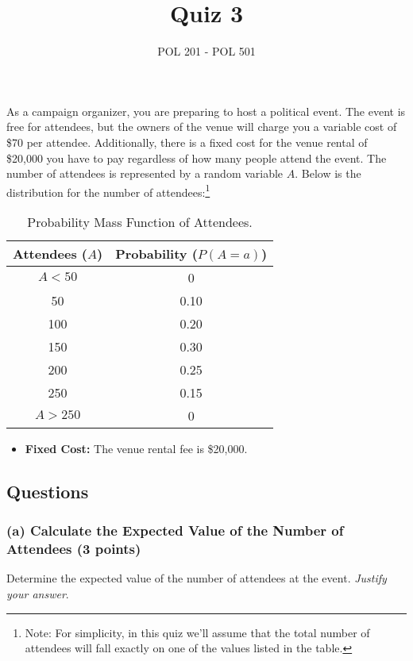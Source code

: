 \documentclass{article}
\title{Quiz 3}
\author{POL 201 - POL 501}
\date{}
\begin{document}
\maketitle


As a campaign organizer, you are preparing to host a political event. The event is free for attendees, but the owners of the venue will charge you a variable cost of \$70 per attendee. Additionally, there is a fixed cost for the venue rental of \$20,000 you have to pay regardless of how many people attend the event. The number of attendees is represented by a random variable $A$. Below is the distribution for the number of attendees:\footnote{Note: For simplicity, in this quiz we'll assume that the total number of attendees will fall exactly on one of the values listed in the table. }

\begin{table}[h!]
\centering
\begin{tabular}{c|c}
    \hline
    Attendees ($A$) & Probability ($P(A = a)$) \\
    \hline
    $A < 50$ & 0 \\
    50 & 0.10 \\
    100 & 0.20 \\
    150 & 0.30 \\
    200 & 0.25 \\
    250 & 0.15 \\
    $A > 250$ & 0 \\
    \hline
\end{tabular}
\caption{Probability Mass Function of Attendees.}
\end{table}
\begin{itemize}
    \item \textbf{Fixed Cost:} The venue rental fee is \$20,000.
\end{itemize}


\subsection*{Questions}

\subsubsection*{(a) Calculate the Expected Value of the Number of Attendees (3 points)}
Determine the expected value of the number of attendees at the event. \emph{Justify your answer}.

\begin{center}
\end{center}
\end{document}
